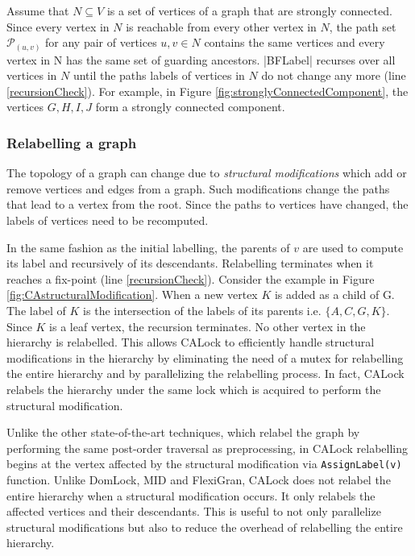 Assume that $N \subseteq V$ is a set of vertices of a graph that are strongly connected. Since every vertex in $N$ is reachable from every other vertex in $N$, the path set $\mathcal{P}_{(u,v)}$ for any pair of vertices $u, v\in N$ contains the same vertices and every vertex in N has the same set of guarding ancestors. \inline|BFLabel| recurses over all vertices in $N$ until the paths labels of vertices in $N$ do not change any more (line \ref{recursionCheck}).
For example, in Figure \ref{fig:stronglyConnectedComponent}, the vertices $G, H, I, J$ form a strongly connected component. 

\subsubsection{Relabelling a graph}

The topology of a graph can change due to \emph{structural modifications} which add or remove vertices and edges from a graph. 
Such modifications change the paths that lead to a vertex from the root.
Since the paths to vertices have changed, the labels of vertices need to be recomputed.

In the same fashion as the initial labelling, the parents of $v$ are used to compute its label and recursively of its descendants. Relabelling terminates when it reaches a fix-point (line \ref{recursionCheck}). 
Consider the example in Figure \ref{fig:CAstructuralModification}. When a new vertex $K$ is added as a child of G. The label of $K$ is the intersection of the labels of its parents i.e. $\{A,C,G,K\}$. Since $K$ is a leaf vertex, the recursion terminates. 
No other vertex in the hierarchy is relabelled. 
This allows CALock to efficiently handle structural modifications in the hierarchy by eliminating the need of a mutex for relabelling the entire hierarchy and by parallelizing the relabelling process. In fact, CALock relabels the hierarchy under the same lock which is acquired to perform the structural modification.

Unlike the other state-of-the-art techniques, which relabel the graph by performing the same post-order traversal as preprocessing, in CALock relabelling begins at the vertex affected by the structural modification via \lstinline|AssignLabel(v)| function. 
Unlike DomLock, MID and FlexiGran, CALock does not relabel the entire hierarchy when a structural modification occurs. 
It only relabels the affected vertices and their descendants. 
This is useful to not only parallelize structural modifications but also to reduce the overhead of relabelling the entire hierarchy.


